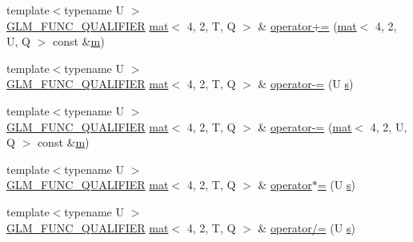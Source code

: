 \begin{DoxyCompactItemize}
\item 
{\footnotesize template$<$typename U $>$ }\\\hyperlink{setup_8hpp_a33fdea6f91c5f834105f7415e2a64407}{G\+L\+M\+\_\+\+F\+U\+N\+C\+\_\+\+Q\+U\+A\+L\+I\+F\+I\+ER} \hyperlink{structglm_1_1mat}{mat}$<$ 4, 2, T, Q $>$ \& \hyperlink{structglm_1_1mat_3_014_00_012_00_01_t_00_01_q_01_4_a3a85d5dbf4a5202ffc6ddaeb8e8d557e}{operator+=} (\hyperlink{structglm_1_1mat}{mat}$<$ 4, 2, U, Q $>$ const \&\hyperlink{_s_d_l__opengl__glext_8h_af593500c283bf1a787a6f947f503a5c2}{m})
\item 
{\footnotesize template$<$typename U $>$ }\\\hyperlink{setup_8hpp_a33fdea6f91c5f834105f7415e2a64407}{G\+L\+M\+\_\+\+F\+U\+N\+C\+\_\+\+Q\+U\+A\+L\+I\+F\+I\+ER} \hyperlink{structglm_1_1mat}{mat}$<$ 4, 2, T, Q $>$ \& \hyperlink{structglm_1_1mat_3_014_00_012_00_01_t_00_01_q_01_4_ab0e7145b2fcb5576fe85581a2d6c0253}{operator-\/=} (U \hyperlink{_s_d_l__opengl_8h_a4af680a6c683f88ed67b76f207f2e6e4}{s})
\item 
{\footnotesize template$<$typename U $>$ }\\\hyperlink{setup_8hpp_a33fdea6f91c5f834105f7415e2a64407}{G\+L\+M\+\_\+\+F\+U\+N\+C\+\_\+\+Q\+U\+A\+L\+I\+F\+I\+ER} \hyperlink{structglm_1_1mat}{mat}$<$ 4, 2, T, Q $>$ \& \hyperlink{structglm_1_1mat_3_014_00_012_00_01_t_00_01_q_01_4_abc0aa02f1c9179e82a6f41e59370f971}{operator-\/=} (\hyperlink{structglm_1_1mat}{mat}$<$ 4, 2, U, Q $>$ const \&\hyperlink{_s_d_l__opengl__glext_8h_af593500c283bf1a787a6f947f503a5c2}{m})
\item 
{\footnotesize template$<$typename U $>$ }\\\hyperlink{setup_8hpp_a33fdea6f91c5f834105f7415e2a64407}{G\+L\+M\+\_\+\+F\+U\+N\+C\+\_\+\+Q\+U\+A\+L\+I\+F\+I\+ER} \hyperlink{structglm_1_1mat}{mat}$<$ 4, 2, T, Q $>$ \& \hyperlink{structglm_1_1mat_3_014_00_012_00_01_t_00_01_q_01_4_aca18c66a3af57e5d99e420867c77792a}{operator$\ast$=} (U \hyperlink{_s_d_l__opengl_8h_a4af680a6c683f88ed67b76f207f2e6e4}{s})
\item 
{\footnotesize template$<$typename U $>$ }\\\hyperlink{setup_8hpp_a33fdea6f91c5f834105f7415e2a64407}{G\+L\+M\+\_\+\+F\+U\+N\+C\+\_\+\+Q\+U\+A\+L\+I\+F\+I\+ER} \hyperlink{structglm_1_1mat}{mat}$<$ 4, 2, T, Q $>$ \& \hyperlink{structglm_1_1mat_3_014_00_012_00_01_t_00_01_q_01_4_a654375437f4f6433308f1e41e5482c8f}{operator/=} (U \hyperlink{_s_d_l__opengl_8h_a4af680a6c683f88ed67b76f207f2e6e4}{s})
\end{DoxyCompactItemize}

